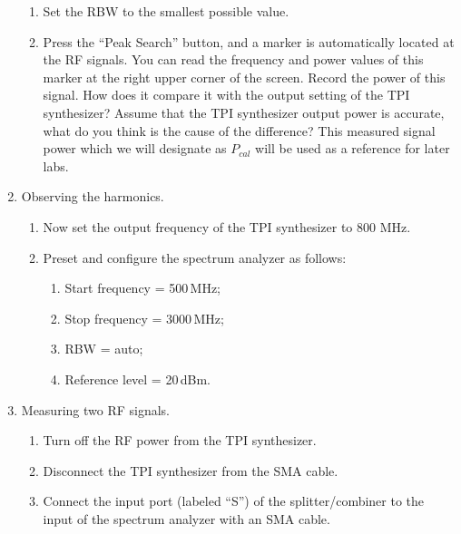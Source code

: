 \documentclass[letterpaper, 11pt]{article}
\begin{document}
\begin{enumerate}
\begin{enumerate}
			\item Set the RBW to the smallest possible value.
							
			\item Press the ``Peak Search'' button, and a marker is automatically located at the RF signals. You can read the frequency and power values of this marker at the right upper corner of the screen. Record the power of this signal. How does it compare it with the output setting of the TPI synthesizer? Assume that the TPI synthesizer output power is accurate, what do you think is the cause of the difference? This measured signal power which we will designate as $P_{cal}$ will be used as a reference for later labs.		
		\end{enumerate}	
		
	\item Observing the harmonics. 
		\begin{enumerate}
			\item Now set the output frequency of the TPI synthesizer to 800 MHz.
			
			\item Preset and configure the spectrum analyzer as follows: 
				\begin{enumerate}
					\item Start frequency = 500\,MHz; 
					\item Stop frequency = 3000\,MHz;
					\item RBW = auto;
					\item Reference level = 20\,dBm.
				\end{enumerate}
		\end{enumerate}	
	
	\item Measuring two RF signals. 
		\begin{enumerate}
			\item Turn off the RF power from the TPI synthesizer.  
			
			\item Disconnect the TPI synthesizer from the SMA cable.
			
			\item Connect the input port (labeled ``S'') of the splitter/combiner to the input of the spectrum analyzer with an SMA cable.
			

\end{enumerate}
\end{enumerate}
\end{document}
